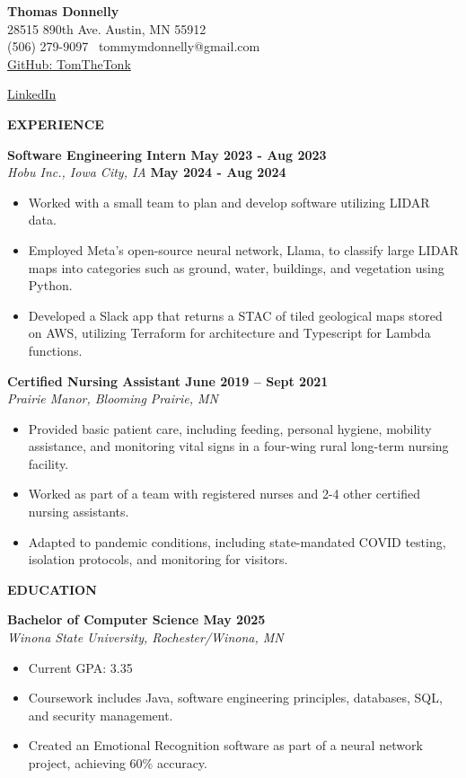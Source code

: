 \textbf{Thomas Donnelly}\\
28515 890th Ave. \textbar{} Austin, MN 55912\\
(506) 279-9097 \textbar~tommymdonnelly@gmail.com\\
\href{https://github.com/TomTheTonk}{GitHub: TomTheTonk}

\href{http://linkedin.com/in/thomas-donnelly-429405320}{LinkedIn}

\textbf{EXPERIENCE}

\textbf{Software Engineering Intern May 2023 - Aug 2023}\\
\emph{Hobu Inc., Iowa City, IA} \textbf{May 2024 - Aug 2024}

\begin{itemize}
\item
  Worked with a small team to plan and develop software utilizing LIDAR
  data.
\item
  Employed Meta's open-source neural network, Llama, to classify large
  LIDAR maps into categories such as ground, water, buildings, and
  vegetation using Python.
\item
  Developed a Slack app that returns a STAC of tiled geological maps
  stored on AWS, utilizing Terraform for architecture and Typescript for
  Lambda functions.
\end{itemize}

\textbf{Certified Nursing Assistant June 2019 -- Sept 2021}\\
\emph{Prairie Manor, Blooming Prairie, MN}

\begin{itemize}
\item
  Provided basic patient care, including feeding, personal hygiene,
  mobility assistance, and monitoring vital signs in a four-wing rural
  long-term nursing facility.
\item
  Worked as part of a team with registered nurses and 2-4 other
  certified nursing assistants.
\item
  Adapted to pandemic conditions, including state-mandated COVID
  testing, isolation protocols, and monitoring for visitors.
\end{itemize}

\textbf{EDUCATION}

\textbf{Bachelor of Computer Science May 2025}\\
\emph{Winona State University, Rochester/Winona, MN}

\begin{itemize}
\item
  Current GPA: 3.35
\item
  Coursework includes Java, software engineering principles, databases,
  SQL, and security management.
\item
  Created an Emotional Recognition software as part of a neural network
  project, achieving 60\% accuracy.
\end{itemize}

